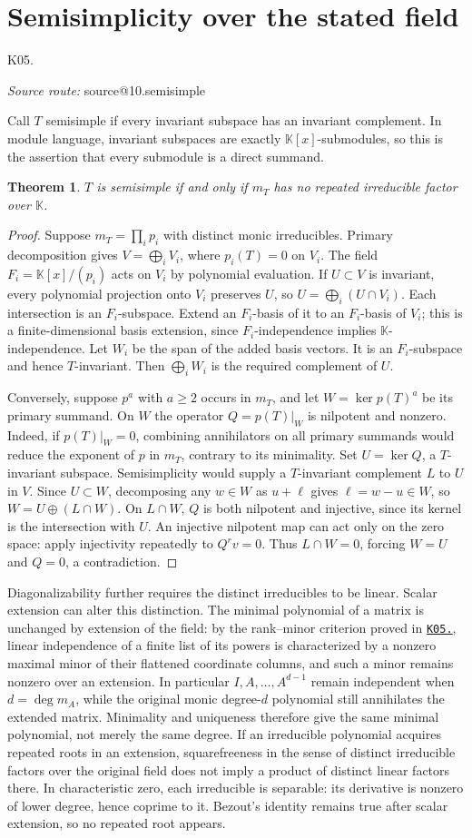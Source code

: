 \documentclass[11pt,a4paper]{book}
\makeatletter
\newtheorem{theorem}{Theorem}[chapter]
\theoremstyle{definition}\newtheorem{definition}[theorem]{Definition}
\theoremstyle{remark}\newtheorem{remark}[theorem]{Remark}
\newcommand{\K}{\mathbb K}\newcommand{\R}{\mathbb R}\newcommand{\C}{\mathbb C}
\newcommand{\kref}[1]{\hyperref[k:#1]{\texttt{K05.\detokenize{#1}}}}
\newcommand{\Kentry}[2]{\section{#2}\label{k:#1}\noindent\textsf{\small K05.\detokenize{#1}}\par
  \begingroup\small\color{black!65}\textit{Source route: }\csname source@#1\endcsname\par\endgroup}
\makeatother
\begin{document}
\Kentry{10.semisimple}{Semisimplicity over the stated field}
Call $T$ semisimple if every invariant subspace has an invariant complement. In module language, invariant subspaces are exactly $\K[x]$-submodules, so this is the assertion that every submodule is a direct summand.
\begin{theorem}
$T$ is semisimple if and only if $m_T$ has no repeated irreducible factor over $\K$.
\end{theorem}
\begin{proof}
Suppose $m_T=\prod_i p_i$ with distinct monic irreducibles. Primary decomposition gives $V=\bigoplus_iV_i$, where $p_i(T)=0$ on $V_i$. The field $F_i=\K[x]/(p_i)$ acts on $V_i$ by polynomial evaluation. If $U\subset V$ is invariant, every polynomial projection onto $V_i$ preserves $U$, so $U=\bigoplus_i(U\cap V_i)$. Each intersection is an $F_i$-subspace. Extend an $F_i$-basis of it to an $F_i$-basis of $V_i$; this is a finite-dimensional basis extension, since $F_i$-independence implies $\K$-independence. Let $W_i$ be the span of the added basis vectors. It is an $F_i$-subspace and hence $T$-invariant. Then $\bigoplus_iW_i$ is the required complement of $U$.

Conversely, suppose $p^a$ with $a\ge2$ occurs in $m_T$, and let $W=\ker p(T)^a$ be its primary summand. On $W$ the operator $Q=p(T)|_W$ is nilpotent and nonzero. Indeed, if $p(T)|_W=0$, combining annihilators on all primary summands would reduce the exponent of $p$ in $m_T$, contrary to its minimality. Set $U=\ker Q$, a $T$-invariant subspace. Semisimplicity would supply a $T$-invariant complement $L$ to $U$ in $V$. Since $U\subset W$, decomposing any $w\in W$ as $u+\ell$ gives $\ell=w-u\in W$, so $W=U\oplus(L\cap W)$. On $L\cap W$, $Q$ is both nilpotent and injective, since its kernel is the intersection with $U$. An injective nilpotent map can act only on the zero space: apply injectivity repeatedly to $Q^r v=0$. Thus $L\cap W=0$, forcing $W=U$ and $Q=0$, a contradiction.
\end{proof}
Diagonalizability further requires the distinct irreducibles to be linear. Scalar extension can alter this distinction. The minimal polynomial of a matrix is unchanged by extension of the field: by the rank--minor criterion proved in \kref{05.adjugate}, linear independence of a finite list of its powers is characterized by a nonzero maximal minor of their flattened coordinate columns, and such a minor remains nonzero over an extension. In particular $I,A,\ldots,A^{d-1}$ remain independent when $d=\deg m_A$, while the original monic degree-$d$ polynomial still annihilates the extended matrix. Minimality and uniqueness therefore give the same minimal polynomial, not merely the same degree. If an irreducible polynomial acquires repeated roots in an extension, squarefreeness in the sense of distinct irreducible factors over the original field does not imply a product of distinct linear factors there. In characteristic zero, each irreducible is separable: its derivative is nonzero of lower degree, hence coprime to it. Bezout's identity remains true after scalar extension, so no repeated root appears.
\end{document}
